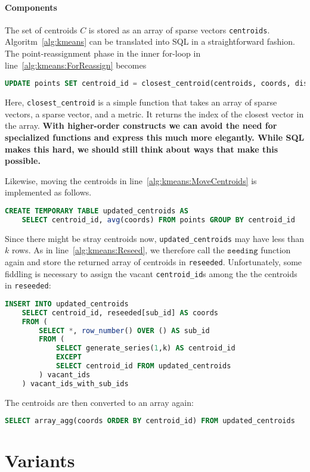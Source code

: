 \documentclass[letterpaper,11pt]{scrreprt}
\numberwithin{equation}{section}
\newcommand{\todo}[1]{\textbf{\color{red}#1}}
\theoremstyle{algorithm}
\begin{document}
\paragraph{Components}

The set of centroids $C$ is stored as an array of sparse vectors \texttt{centroids}. Algoritm~\ref{alg:kmeans} can be translated into SQL in a straightforward fashion. The point-reassignment phase in the inner for-loop in line~\ref{alg:kmeans:ForReassign} becomes
\begin{lstlisting}[language=SQL]
	UPDATE points SET centroid_id = closest_centroid(centroids, coords, dist)
\end{lstlisting}
Here, \texttt{closest\_centroid} is a simple function that takes an array of sparse vectors, a sparse vector, and a metric. It returns the index of the closest vector in the array. \todo{With higher-order constructs we can avoid the need for specialized functions and express this much more elegantly. While SQL makes this hard, we should still think about ways that make this possible.}

Likewise, moving the centroids in line~\ref{alg:kmeans:MoveCentroids} is implemented as follows.
\begin{lstlisting}[language=SQL]
	CREATE TEMPORARY TABLE updated_centroids AS
	SELECT centroid_id, avg(coords) FROM points GROUP BY centroid_id
\end{lstlisting}
Since there might be stray centroids now, \texttt{updated\_centroids} may have less than $k$ rows. As in line~\ref{alg:kmeans:Reseed}, we therefore call the $\texttt{seeding}$ function again and store the returned array of centroids in \texttt{reseeded}. Unfortunately, some fiddling is necessary to assign the vacant \texttt{centroid\_id}s among the the centroids in \texttt{reseeded}:
\begin{lstlisting}[language=SQL]
	INSERT INTO updated_centroids
	SELECT centroid_id, reseeded[sub_id] AS coords
	FROM (
	    SELECT *, row_number() OVER () AS sub_id
	    FROM (
	        SELECT generate_series(1,k) AS centroid_id
	        EXCEPT
	        SELECT centroid_id FROM updated_centroids
	    ) vacant_ids
	) vacant_ids_with_sub_ids
\end{lstlisting}
The centroids are then converted to an array again:
\begin{lstlisting}[language=SQL]
	SELECT array_agg(coords ORDER BY centroid_id) FROM updated_centroids
\end{lstlisting}


\section{Variants}
\end{document}
